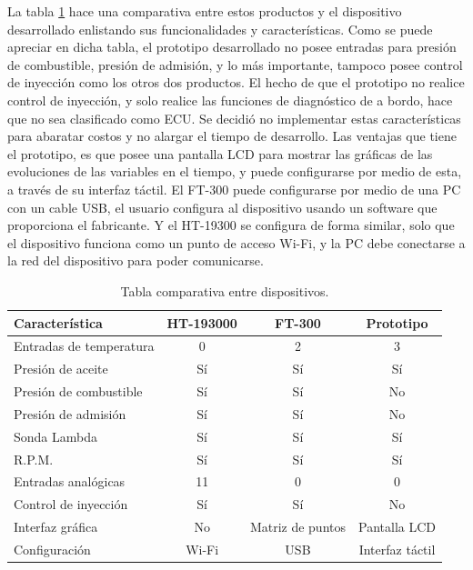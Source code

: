 La tabla \ref{tab:comparativa} hace una comparativa entre estos productos y el dispositivo desarrollado enlistando sus funcionalidades y características.  Como se puede apreciar en dicha tabla, el prototipo desarrollado no posee entradas para presión de combustible, presión de admisión, y lo más importante, tampoco posee control de inyección como los otros dos productos. El hecho de que el prototipo no realice control de inyección, y solo realice las funciones de diagnóstico de a bordo, hace que no sea clasificado como ECU. Se decidió no implementar estas características para abaratar costos y no alargar el tiempo de desarrollo. Las ventajas que tiene el prototipo, es que posee una pantalla LCD para mostrar las gráficas de las evoluciones de las variables en el tiempo, y puede configurarse por medio de esta, a través de su interfaz táctil. El FT-300 puede configurarse por medio de una PC con un cable USB, el usuario configura al dispositivo usando un software que proporciona el fabricante. Y el HT-19300 se configura de forma similar, solo que el dispositivo funciona como un punto de acceso Wi-Fi, y la PC debe conectarse a la red del dispositivo para poder comunicarse.

\begin{table}[htpb]
	\centering
	\caption[Tabla comparativa entre dispositivos.]{Tabla comparativa entre dispositivos.}
	\centering
	\begin{tabular}{l c c c}    
		\toprule
		\textbf{Característica }     & \textbf{HT-193000} & \textbf{FT-300} & \textbf{Prototipo}\\
		\midrule
		Entradas de temperatura	&  0 &   2 &  3\\
		Presión de aceite		& Sí &  Sí & Sí\\
		Presión de combustible	& Sí &  Sí & No\\
		Presión de admisión		& Sí &  Sí & No\\
		Sonda Lambda			& Sí &  Sí & Sí\\
		R.P.M.					& Sí &  Sí & Sí\\
		Entradas analógicas		& 11 &  0  &  0\\
		Control de inyección	& Sí &  Sí & No\\
		Interfaz gráfica		& No &  Matriz de puntos & Pantalla LCD \\
		Configuración			& Wi-Fi & USB & Interfaz táctil \\ 
		\bottomrule
	\end{tabular}
	\label{tab:comparativa}
\end{table}